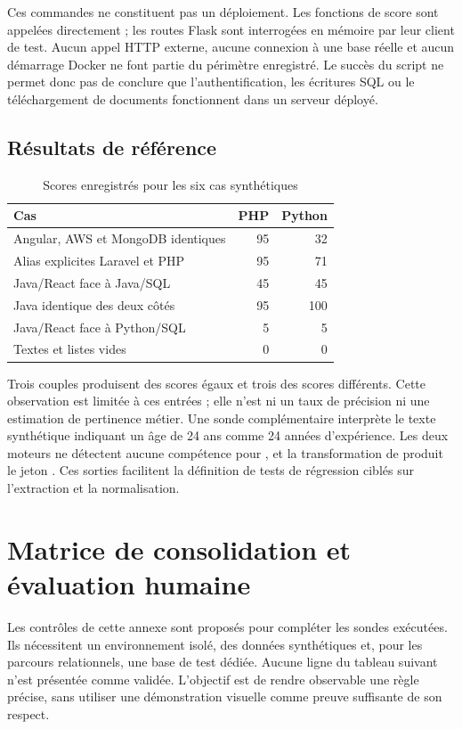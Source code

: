 Ces commandes ne constituent pas un déploiement. Les fonctions de score sont appelées directement ; les routes Flask sont interrogées en mémoire par leur client de test. Aucun appel HTTP externe, aucune connexion à une base réelle et aucun démarrage Docker ne font partie du périmètre enregistré. Le succès du script ne permet donc pas de conclure que l'authentification, les écritures SQL ou le téléchargement de documents fonctionnent dans un serveur déployé.

\section{Résultats de référence}

\begin{table}[htbp]
\centering
\small
\caption{Scores enregistrés pour les six cas synthétiques}
\label{tab:ann-six-cas}
\begin{tabularx}{\textwidth}{@{}Xrr@{}}
\toprule
Cas & PHP & Python \\
\midrule
Angular, AWS et MongoDB identiques & 95 & 32 \\
Alias explicites Laravel et PHP & 95 & 71 \\
Java/React face à Java/SQL & 45 & 45 \\
Java identique des deux côtés & 95 & 100 \\
Java/React face à Python/SQL & 5 & 5 \\
Textes et listes vides & 0 & 0 \\
\bottomrule
\end{tabularx}
\end{table}

Trois couples produisent des scores égaux et trois des scores différents. Cette observation est limitée à ces entrées ; elle n'est ni un taux de précision ni une estimation de pertinence métier. Une sonde complémentaire interprète le texte synthétique indiquant un âge de 24 ans comme 24 années d'expérience. Les deux moteurs ne détectent aucune compétence pour , et la transformation de  produit le jeton . Ces sorties facilitent la définition de tests de régression ciblés sur l'extraction et la normalisation.

\chapter{Matrice de consolidation et évaluation humaine}
\label{ann:evaluation}

Les contrôles de cette annexe sont proposés pour compléter les sondes exécutées. Ils nécessitent un environnement isolé, des données synthétiques et, pour les parcours relationnels, une base de test dédiée. Aucune ligne du tableau suivant n'est présentée comme validée. L'objectif est de rendre observable une règle précise, sans utiliser une démonstration visuelle comme preuve suffisante de son respect.

